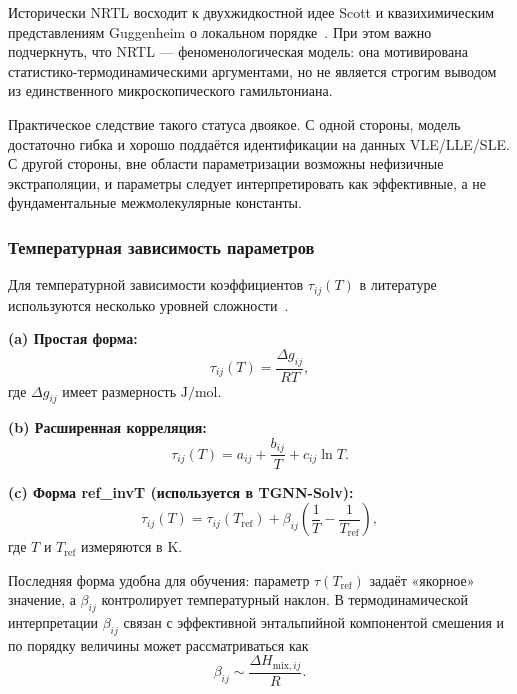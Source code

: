 \documentclass[11pt]{article}
\begin{document}
Исторически NRTL восходит к двухжидкостной идее Scott и квазихимическим представлениям Guggenheim о локальном порядке~\cite{scott1956,guggenheim1952}. При этом важно подчеркнуть, что NRTL --- феноменологическая модель: она мотивирована статистико-термодинамическими аргументами, но не является строгим выводом из единственного микроскопического гамильтониана.

Практическое следствие такого статуса двоякое. С одной стороны, модель достаточно гибка и хорошо поддаётся идентификации на данных VLE/LLE/SLE. С другой стороны, вне области параметризации возможны нефизичные экстраполяции, и параметры следует интерпретировать как эффективные, а не фундаментальные межмолекулярные константы.

\subsubsection{Температурная зависимость параметров}

Для температурной зависимости коэффициентов $\tau_{ij}(T)$ в литературе используются несколько уровней сложности~\cite{renon1968,weidlich1987,prausnitz1998}.

\textbf{(a) Простая форма:}
\begin{equation*}
\tau_{ij}(T)=\frac{\Delta g_{ij}}{RT},
\end{equation*}
где $\Delta g_{ij}$ имеет размерность $\mathrm{J/mol}$.

\textbf{(b) Расширенная корреляция:}
\begin{equation*}
\tau_{ij}(T)=a_{ij}+\frac{b_{ij}}{T}+c_{ij}\ln T.
\end{equation*}

\textbf{(c) Форма ref\_invT (используется в TGNN-Solv):}
\begin{equation*}
\tau_{ij}(T)=\tau_{ij}(T_{\mathrm{ref}})+\beta_{ij}\left(\frac{1}{T}-\frac{1}{T_{\mathrm{ref}}}\right),
\end{equation*}
где $T$ и $T_{\mathrm{ref}}$ измеряются в $\mathrm{K}$.

Последняя форма удобна для обучения: параметр $\tau(T_{\mathrm{ref}})$ задаёт «якорное» значение, а $\beta_{ij}$ контролирует температурный наклон. В термодинамической интерпретации $\beta_{ij}$ связан с эффективной энтальпийной компонентой смешения и по порядку величины может рассматриваться как
\begin{equation*}
\beta_{ij}\sim \frac{\Delta H_{\mathrm{mix},ij}}{R}.
\end{equation*}
\end{document}
